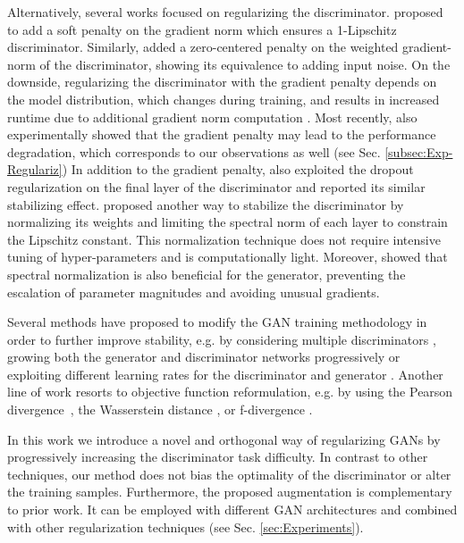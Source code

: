 \documentclass{article}
\begin{document}
Alternatively, several works focused on regularizing the discriminator.
\cite{gulrajani_NIPS2017} proposed to add a soft penalty on the gradient norm which ensures a 1-Lipschitz discriminator. Similarly, \cite{Roth_NIPS2017} added a zero-centered penalty on the weighted gradient-norm of the discriminator, showing its equivalence to adding input noise.
On the downside, regularizing the discriminator with the gradient penalty depends on the model distribution, which changes during training, and results in increased runtime due to additional gradient norm computation \cite{Kurach2018GANlandscape}. Most recently, \cite{Brock2019} also experimentally showed that the gradient penalty may lead to the performance degradation, which corresponds to our observations as well (see Sec. \ref{subsec:Exp-Regulariz}) 
In addition to the gradient penalty, \cite{Brock2019} also exploited the dropout regularization \cite{JMLR:v15:srivastava14a} on the final layer of the discriminator and reported its similar stabilizing effect.
\cite{miyato2018spectral} proposed another way to stabilize the discriminator by normalizing its weights and limiting the spectral norm of each layer to constrain the Lipschitz constant. This normalization technique does not require intensive tuning of hyper-parameters and is computationally light.
Moreover, \cite{Zhang_SAGAN18} showed that spectral normalization is also beneficial for the generator, preventing the escalation of parameter magnitudes and avoiding unusual gradients. 

Several methods have proposed to modify the GAN training methodology in order to further improve stability, e.g. by considering multiple discriminators \cite{Durugkar2016GenerativeMN}, growing both the generator and discriminator networks progressively \cite{karras2018progressive} or exploiting different learning rates for the discriminator and generator \cite{heuselttur2017}. Another line of work resorts to objective function reformulation, e.g. by using the Pearson  divergence~\cite{MaoLXLW16}, the Wasserstein distance \cite{Arjovsky2017WGAN}, or f-divergence \cite{Nowozin2016fGANTG}.

In this work we introduce a novel and orthogonal way of regularizing GANs by progressively increasing the discriminator task difficulty. In contrast to other techniques, our method does not bias the optimality of the discriminator or alter the training samples.
Furthermore, the proposed augmentation is complementary to prior work. It can be employed with different GAN architectures and combined with other regularization techniques (see Sec. \ref{sec:Experiments}).
\end{document}
